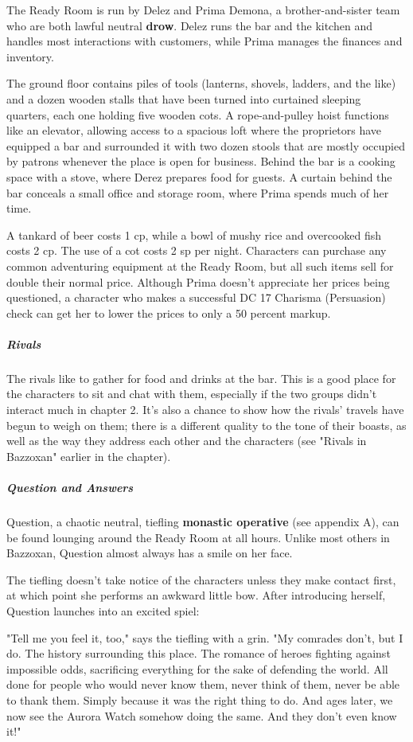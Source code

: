 \documentclass[10pt,a4paper,twoside,fancy,bg=print,twocolumn,openany,nodeprecatedcode]{dndbook}
\begin{document}
The Ready Room is run by Delez and Prima Demona, a brother-and-sister team who are both lawful neutral \textbf{drow}. Delez runs the bar and the kitchen and handles most interactions with customers, while Prima manages the finances and inventory.

The ground floor contains piles of tools (lanterns, shovels, ladders, and the like) and a dozen wooden stalls that have been turned into curtained sleeping quarters, each one holding five wooden cots. A rope-and-pulley hoist functions like an elevator, allowing access to a spacious loft where the proprietors have equipped a bar and surrounded it with two dozen stools that are mostly occupied by patrons whenever the place is open for business. Behind the bar is a cooking space with a stove, where Derez prepares food for guests. A curtain behind the bar conceals a small office and storage room, where Prima spends much of her time.

A tankard of beer costs 1 cp, while a bowl of mushy rice and overcooked fish costs 2 cp. The use of a cot costs 2 sp per night. Characters can purchase any common adventuring equipment at the Ready Room, but all such items sell for double their normal price. Although Prima doesn't appreciate her prices being questioned, a character who makes a successful DC 17 Charisma (Persuasion) check can get her to lower the prices to only a 50 percent markup.

\subparagraph{Rivals}
The rivals like to gather for food and drinks at the bar. This is a good place for the characters to sit and chat with them, especially if the two groups didn't interact much in chapter 2. It's also a chance to show how the rivals' travels have begun to weigh on them; there is a different quality to the tone of their boasts, as well as the way they address each other and the characters (see "Rivals in Bazzoxan" earlier in the chapter).

\subparagraph{Question and Answers}
Question, a chaotic neutral, tiefling \textbf{monastic operative} (see appendix A), can be found lounging around the Ready Room at all hours. Unlike most others in Bazzoxan, Question almost always has a smile on her face.

The tiefling doesn't take notice of the characters unless they make contact first, at which point she performs an awkward little bow. After introducing herself, Question launches into an excited spiel:

\begin{DndReadAloud}{}
"Tell me you feel it, too," says the tiefling with a grin. "My comrades don't, but I do. The history surrounding this place. The romance of heroes fighting against impossible odds, sacrificing everything for the sake of defending the world. All done for people who would never know them, never think of them, never be able to thank them. Simply because it was the right thing to do. And ages later, we now see the Aurora Watch somehow doing the same. And they don't even know it!"

\end{DndReadAloud}
\end{document}
